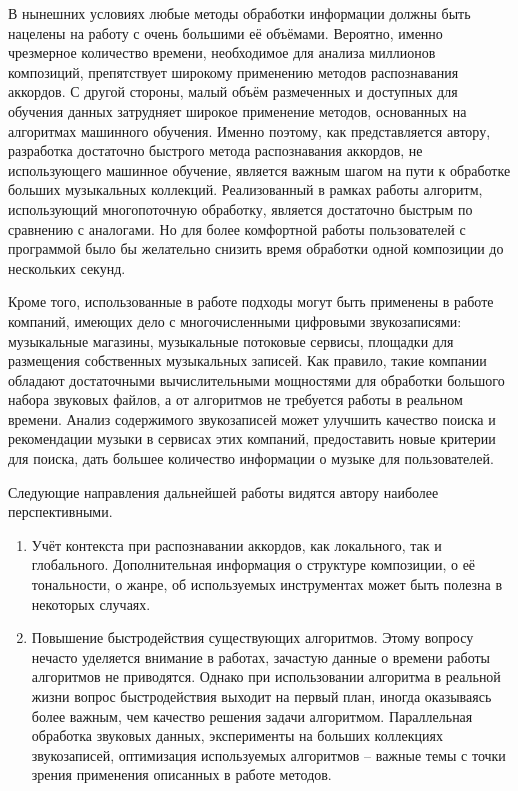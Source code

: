 В нынешних условиях любые методы обработки информации должны быть нацелены на
работу с очень большими её объёмами. Вероятно, именно чрезмерное количество
времени, необходимое для анализа миллионов композиций, препятствует широкому
применению методов распознавания аккордов. С другой стороны, малый объём
размеченных и доступных для обучения данных затрудняет широкое применение
методов, основанных на алгоритмах машинного обучения. Именно поэтому, как
представляется автору, разработка достаточно быстрого метода распознавания
аккордов, не использующего машинное обучение, является важным шагом на пути к
обработке больших музыкальных коллекций. Реализованный в рамках работы алгоритм,
использующий многопоточную обработку, является достаточно быстрым по сравнению с
аналогами. Но для более комфортной работы пользователей с программой было бы
желательно снизить время обработки одной композиции до нескольких секунд.

Кроме того, использованные в работе подходы могут быть применены в работе
компаний, имеющих дело с многочисленными цифровыми звукозаписями: музыкальные
магазины, музыкальные потоковые сервисы, площадки для размещения собственных
музыкальных записей. Как правило, такие компании обладают достаточными
вычислительными мощностями для обработки большого набора звуковых файлов, а от
алгоритмов не требуется работы в реальном времени. Анализ содержимого 
звукозаписей может улучшить качество поиска и рекомендации музыки в сервисах
этих компаний, предоставить новые критерии для поиска, дать большее количество
информации о музыке для пользователей.

Следующие направления дальнейшей работы видятся автору наиболее перспективными.
\begin{enumerate}
  \item Учёт контекста при распознавании аккордов, как локального, так и
  глобального. Дополнительная информация о структуре композиции, о её
  тональности, о жанре, об используемых инструментах может быть полезна в
  некоторых случаях.
  \item Повышение быстродействия существующих алгоритмов. Этому вопросу нечасто
  уделяется внимание в работах, зачастую данные о времени работы алгоритмов не
  приводятся. Однако при использовании алгоритма в реальной жизни вопрос
  быстродействия выходит на первый план, иногда оказываясь более важным, чем
  качество решения задачи алгоритмом. Параллельная обработка звуковых данных,
  эксперименты на больших коллекциях звукозаписей, оптимизация используемых
  алгоритмов -- важные темы с точки зрения применения описанных в работе
  методов.
\end{enumerate}

\clearpage